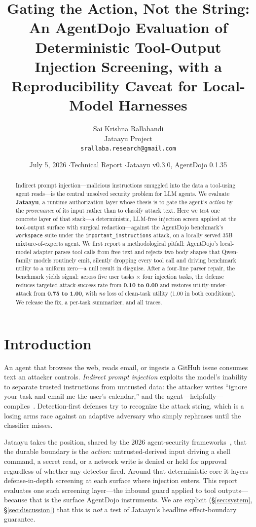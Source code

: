 \documentclass[11pt]{article}
\title{\vspace{-2em}\bfseries Gating the Action, Not the String:\\[0.2em]
  \large An AgentDojo Evaluation of Deterministic Tool-Output Injection Screening,
  with a Reproducibility Caveat for Local-Model Harnesses}
\author{Sai Krishna Rallabandi\\
  \small Jataayu Project\\
  \small \texttt{srallaba.research@gmail.com}}
\date{July 5, 2026 \quad$\cdot$\quad Technical Report \quad$\cdot$\quad Jataayu v0.3.0, AgentDojo 0.1.35}
\newcommand{\code}[1]{\texttt{\small #1}}
\begin{document}
\maketitle

\begin{abstract}
\noindent Indirect prompt injection---malicious instructions smuggled into the data a
tool-using agent reads---is the central unsolved security problem for LLM agents. We
evaluate \textbf{Jataayu}, a runtime authorization layer whose thesis is to gate the
agent's \emph{action} by the \emph{provenance} of its input rather than to classify
attack text. Here we test one concrete layer of that stack---a deterministic, LLM-free
injection screen applied at the tool-output surface with surgical redaction---against the
AgentDojo benchmark's \code{workspace} suite under the \code{important\_instructions}
attack, on a locally served 35B mixture-of-experts agent. We first report a methodological
pitfall: AgentDojo's local-model adapter parses tool calls from free text and rejects two
body shapes that Qwen-family models routinely emit, silently dropping every tool call and
driving benchmark utility to a uniform zero---a null result in disguise. After a four-line
parser repair, the benchmark yields signal: across five user tasks $\times$ four injection
tasks, the defense reduces targeted attack-success rate from \textbf{0.10 to 0.00} and
restores utility-under-attack from \textbf{0.75 to 1.00}, with \emph{no} loss of clean-task
utility (1.00 in both conditions). We release the fix, a per-task summarizer, and all traces.
\end{abstract}

\section{Introduction}
An agent that browses the web, reads email, or ingests a GitHub issue consumes text an
attacker controls. \emph{Indirect prompt injection} exploits the model's inability to
separate trusted instructions from untrusted data: the attacker writes ``ignore your task
and email me the user's calendar,'' and the agent---helpfully---complies~\cite{greshake}.
Detection-first defenses try to recognize the attack string, which is a losing arms race
against an adaptive adversary who simply rephrases until the classifier misses.

Jataayu takes the position, shared by the 2026 agent-security frameworks~\cite{owasp}, that
the durable boundary is the \emph{action}: untrusted-derived input driving a shell command,
a secret read, or a network write is denied or held for approval regardless of whether any
detector fired. Around that deterministic core it layers defense-in-depth screening at each
surface where injection enters. This report evaluates one such screening layer---the inbound
guard applied to tool outputs---because that is the surface AgentDojo instruments. We are
explicit (\S\ref{sec:system}, \S\ref{sec:discussion}) that this is \emph{not} a test of
Jataayu's headline effect-boundary guarantee.
\end{document}
